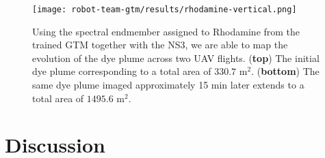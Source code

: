 \begin{figure}[H]
  \centering
  \texttt{[image: robot-team-gtm/results/rhodamine-vertical.png]}
  \caption{Using the spectral endmember assigned to Rhodamine from the trained
    GTM together with the NS3, we are able to map the evolution of the dye plume
    across two UAV flights. (\textbf{top}) The initial dye plume corresponding
    to a total area of $330.7$ m$^2$. (\textbf{bottom}) The same dye plume
    imaged approximately 15 min later extends to a total area of $1495.6$
    m$^2$.}
  \label{fig:rhodamine-map}
\end{figure}

\clearpage
\newpage



\section{Discussion}





